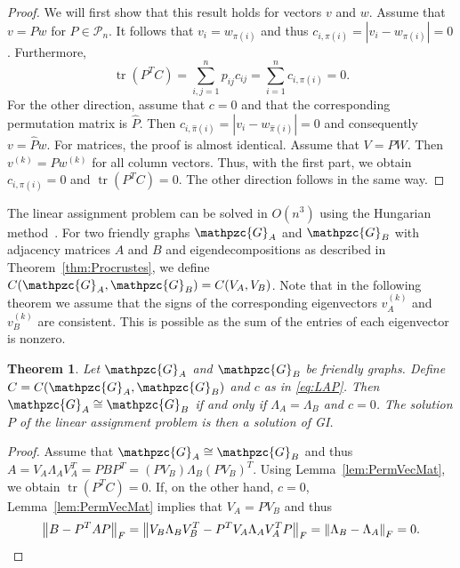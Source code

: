 \documentclass
[
    a4paper,
    DIV=11,
    abstracton
]
{scrartcl}
\newcommand{\mc}[1]{\mathpzc{#1}}
\providecommand{\abs}[1]{\left\lvert #1 \right\rvert}
\providecommand{\norm}[1]{\left\lVert #1 \right\rVert}
\DeclareMathOperator{\tr}{tr}
\newtheorem{theorem}{Theorem}[section]
\theoremstyle{definition}
\begin{document}
\begin{proof}
We will first show that this result holds for vectors $ v $ and $ w $. Assume that $ v = P w $ for $ P \in \mathcal{P}_n $. It follows that $ v_i = w_{\pi(i)} $ and thus $ c_{i, \pi(i)} = \abs{ v_i - w_{\pi(i)} } = 0 $. Furthermore,
\begin{equation*}
    \tr \left( P^T C \right) = \sum_{i,j=1}^n p_{ij} c_{ij} = \sum_{i=1}^n c_{i, \pi(i)} = 0.
\end{equation*}
For the other direction, assume that $ c = 0 $ and that the corresponding permutation matrix is $ \hat{P} $. Then $ c_{i, \hat{\pi}(i)} = \abs{ v_i - w_{\hat{\pi}(i)} } = 0 $ and consequently $ v = \hat{P} w $.
For matrices, the proof is almost identical. Assume that $ V = P W $. Then $ v^{(k)} = P w^{(k)} $ for all column vectors. Thus, with the first part, we obtain $ c_{i, \pi(i)} = 0 $ and $ \tr \left( P^T C \right) = 0 $. The other direction follows in the same way.
\end{proof}

The linear assignment problem can be solved in $ \mathit{O}(n^3) $ using the Hungarian method~\cite{Kuh55, BC99}. For two friendly graphs $ \mc{G}_A $ and $ \mc{G}_B $ with adjacency matrices $ A $ and $ B $ and eigendecompositions as described in Theorem~\ref{thm:Procrustes}, we define $ C(\mc{G}_A, \mc{G}_B) = C(V_A, V_B) $. Note that in the following theorem we assume that the signs of the corresponding eigenvectors $ v_A^{(k)} $ and $ v_B^{(k)} $ are consistent. This is possible as the sum of the entries of each eigenvector is nonzero.

\begin{theorem} \label{thm:GI friendly graphs}
Let $ \mc{G}_A $ and $ \mc{G}_B $ be friendly graphs. Define $ C = C(\mc{G}_A, \mc{G}_B) $ and $ c $ as in \eqref{eq:LAP}. Then $ \mc{G}_A \cong \mc{G}_B $ if and only if $ \Lambda_A = \Lambda_B $ and $ c = 0 $. The solution $ P $ of the linear assignment problem is then a solution of GI.
\end{theorem}

\begin{proof}
Assume that $ \mc{G}_A \cong \mc{G}_B $ and thus $ A = V_A \Lambda_A V_A^T = P B P^T = (P V_B) \Lambda_B (P V_B)^T $. Using Lemma~\ref{lem:PermVecMat}, we obtain $ \tr \left( P^T C \right) = 0 $.
If, on the other hand, $ c = 0 $, Lemma~\ref{lem:PermVecMat} implies that $ V_A = P V_B $ and thus
\begin{equation*}
    \norm{B - P^T A P}_F = \norm{V_B \Lambda_B V_B^T - P^T V_A \Lambda_A V_A^T P}_F = \norm{ \Lambda_B - \Lambda_A}_F = 0. \qedhere
\end{equation*}
\end{proof}
\end{document}
